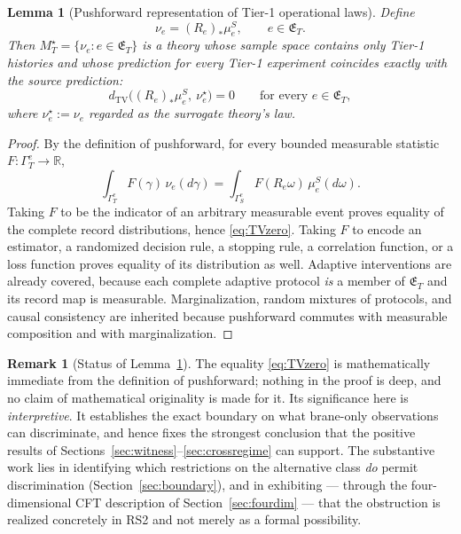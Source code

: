 \documentclass[11pt,a4paper]{article}
\theoremstyle{plain}
\newtheorem{lemma}[theorem]{Lemma}
\theoremstyle{definition}
\newtheorem{remark}[theorem]{Remark}
\begin{document}
\begin{lemma}[Pushforward representation of Tier-1 operational laws]
\label{lem:pushforward}
Define
\begin{equation}
\label{eq:nu}
\boxed{\;
\nu_e=(R_e)_*\mu^S_e,
\qquad e\in\mathfrak E_T .
\;}
\end{equation}
Then $M^\star_T=\{\nu_e:e\in\mathfrak E_T\}$ is a theory whose sample
space contains only Tier-1 histories and whose prediction for every
Tier-1 experiment coincides exactly with the source prediction:
\begin{equation}
\label{eq:TVzero}
d_{\mathrm{TV}}\bigl((R_e)_*\mu^S_e,\ \nu^\star_e\bigr)=0
\qquad\text{for every }e\in\mathfrak E_T ,
\end{equation}
where $\nu^\star_e:=\nu_e$ regarded as the surrogate theory's law.
\end{lemma}

\begin{proof}
By the definition of pushforward, for every bounded measurable statistic
$F:\Gamma^e_T\to\mathbb R$,
\begin{equation}
\label{eq:changeofvars}
\int_{\Gamma^e_T}F(\gamma)\,\nu_e(d\gamma)
=\int_{\Gamma^e_S}F(R_e\omega)\,\mu^S_e(d\omega).
\end{equation}
Taking $F$ to be the indicator of an arbitrary measurable event proves
equality of the complete record distributions, hence \eqref{eq:TVzero}.
Taking $F$ to encode an estimator, a randomized decision rule, a stopping
rule, a correlation function, or a loss function proves equality of its
distribution as well. Adaptive interventions are already covered, because
each complete adaptive protocol \emph{is} a member of $\mathfrak E_T$ and
its record map is measurable. Marginalization, random mixtures of
protocols, and causal consistency are inherited because pushforward
commutes with measurable composition and with marginalization.
\end{proof}

\begin{remark}[Status of Lemma~\ref{lem:pushforward}]
\label{rem:pushstatus}
The equality \eqref{eq:TVzero} is mathematically immediate from the
definition of pushforward; nothing in the proof is deep, and no claim of
mathematical originality is made for it. Its significance here is
\emph{interpretive}. It establishes the exact boundary on what brane-only
observations can discriminate, and hence fixes the strongest conclusion
that the positive results of
Sections~\ref{sec:witness}--\ref{sec:crossregime} can support. The
substantive work lies in identifying which restrictions on the alternative
class \emph{do} permit discrimination
(Section~\ref{sec:boundary}), and in exhibiting --- through the
four-dimensional CFT description of Section~\ref{sec:fourdim} --- that the
obstruction is realized concretely in RS2 and not merely as a formal
possibility.
\end{remark}
\end{document}
